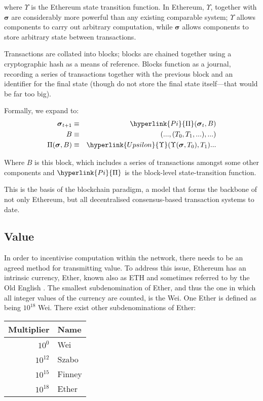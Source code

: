 \documentclass[9pt,oneside]{amsart}
\begin{document}
\begin{multicols}{2}
where $\Upsilon$ is the Ethereum state transition function. In Ethereum, $\Upsilon$, together with $\boldsymbol{\sigma}$ are considerably more powerful than any existing comparable system; $\Upsilon$ allows components to carry out arbitrary computation, while $\boldsymbol{\sigma}$ allows components to store arbitrary state between transactions.

Transactions are collated into blocks; blocks are chained together using a cryptographic hash as a means of reference. Blocks function as a journal, recording a series of transactions together with the previous block and an identifier for the final state (though do not store the final state itself---that would be far too big).

Formally, we expand to:
\begin{eqnarray}
\boldsymbol{\sigma}_{t+1} & \equiv & \hyperlink{Pi}{\Pi}(\boldsymbol{\sigma}_{t}, B) \\
B & \equiv & (..., (T_0, T_1, ...), ...) \\
\Pi(\boldsymbol{\sigma}, B) & \equiv & \hyperlink{Upsilon}{\Upsilon}(\Upsilon(\boldsymbol{\sigma}, T_0), T_1) ...
\end{eqnarray}

Where \hyperlink{block}{$B$} is this block, which includes a series of transactions amongst some other components and $\hyperlink{Pi}{\Pi}$ is the block-level state-transition function.

This is the basis of the blockchain paradigm, a model that forms the backbone of not only Ethereum, but all decentralised consensus-based transaction systems to date.

\subsection{Value}

In order to incentivise computation within the network, there needs to be an agreed method for transmitting value. To address this issue, Ethereum has an intrinsic currency, Ether, known also as {\small ETH} and sometimes referred to by the Old English \DH{}. The smallest subdenomination of Ether, and thus the one in which all integer values of the currency are counted, is the Wei. One Ether is defined as being $10^{18}$ Wei. There exist other subdenominations of Ether:
\par
\begin{center}
\begin{tabular}{rl}
\toprule
Multiplier & Name \\
\midrule
$10^0$ & Wei \\
$10^{12}$ & Szabo \\
$10^{15}$ & Finney \\
$10^{18}$ & Ether \\
\bottomrule
\end{tabular}
\end{center}
\par


\end{multicols}
\end{document}
